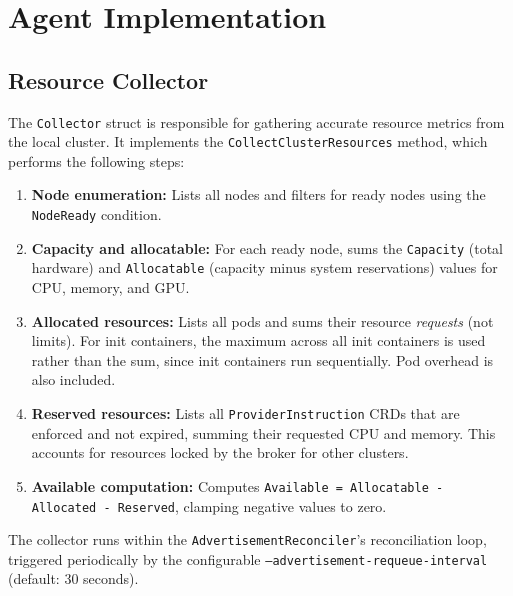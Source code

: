 \section{Agent Implementation}
\label{sec:agent-impl}

\subsection{Resource Collector}
\label{subsec:resource-collector}

The \texttt{Collector} struct is responsible for gathering accurate resource metrics from the local cluster. It implements the \texttt{CollectClusterResources} method, which performs the following steps:

\begin{enumerate}
    \item \textbf{Node enumeration:} Lists all nodes and filters for ready nodes using the \texttt{NodeReady} condition.

    \item \textbf{Capacity and allocatable:} For each ready node, sums the \texttt{Capacity} (total hardware) and \texttt{Allocatable} (capacity minus system reservations) values for CPU, memory, and GPU.

    \item \textbf{Allocated resources:} Lists all pods and sums their resource \textit{requests} (not limits). For init containers, the maximum across all init containers is used rather than the sum, since init containers run sequentially. Pod overhead is also included.

    \item \textbf{Reserved resources:} Lists all \texttt{ProviderInstruction} CRDs that are enforced and not expired, summing their requested CPU and memory. This accounts for resources locked by the broker for other clusters.

    \item \textbf{Available computation:} Computes \texttt{Available = Allocatable - Allocated - Reserved}, clamping negative values to zero.
\end{enumerate}

The collector runs within the \texttt{AdvertisementReconciler}'s reconciliation loop, triggered periodically by the configurable \texttt{--advertisement-requeue-interval} (default: 30 seconds).

